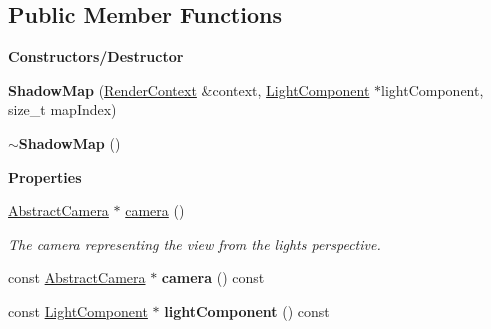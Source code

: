 \subsection*{Public Member Functions}
\begin{Indent}\textbf{ Constructors/\+Destructor}\par
\begin{DoxyCompactItemize}
\item 
\mbox{\label{classrev_1_1_shadow_map_a562504741082b7e3d2da96643d5c1edd}} 
{\bfseries Shadow\+Map} (\mbox{\hyperlink{classrev_1_1_render_context}{Render\+Context}} \&context, \mbox{\hyperlink{classrev_1_1_light_component}{Light\+Component}} $\ast$light\+Component, size\+\_\+t map\+Index)
\item 
\mbox{\label{classrev_1_1_shadow_map_a19ee20cb48e44b9e99a63e1190d8ae1d}} 
{\bfseries $\sim$\+Shadow\+Map} ()
\end{DoxyCompactItemize}
\end{Indent}
\begin{Indent}\textbf{ Properties}\par
\begin{DoxyCompactItemize}
\item 
\mbox{\label{classrev_1_1_shadow_map_ae2b430097b8dd79e6dedbc03640c5a47}} 
\mbox{\hyperlink{classrev_1_1_abstract_camera}{Abstract\+Camera}} $\ast$ \mbox{\hyperlink{classrev_1_1_shadow_map_ae2b430097b8dd79e6dedbc03640c5a47}{camera}} ()
\begin{DoxyCompactList}\small\item\em The camera representing the view from the light\textquotesingle{}s perspective. \end{DoxyCompactList}\item 
\mbox{\label{classrev_1_1_shadow_map_a8e443bdbc2064278a1dd02f7fc81313d}} 
const \mbox{\hyperlink{classrev_1_1_abstract_camera}{Abstract\+Camera}} $\ast$ {\bfseries camera} () const
\item 
\mbox{\label{classrev_1_1_shadow_map_a60d9ce367402d061207823913d7ab535}} 
const \mbox{\hyperlink{classrev_1_1_light_component}{Light\+Component}} $\ast$ {\bfseries light\+Component} () const
\end{DoxyCompactItemize}
\end{Indent}
